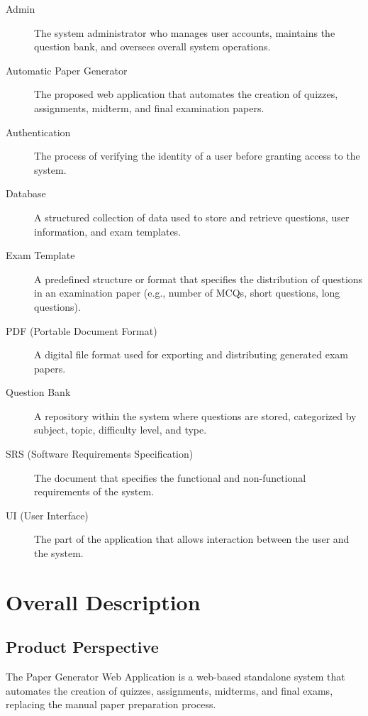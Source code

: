 \documentclass[12pt]{article}
\begin{document}
	\begin{description}
		\item[Admin] The system administrator who manages user accounts, maintains the question bank, and oversees overall system operations.
		
		\item[Automatic Paper Generator] The proposed web application that automates the creation of quizzes, assignments, midterm, and final examination papers.
		
		\item[Authentication] The process of verifying the identity of a user before granting access to the system.
		
		\item[Database] A structured collection of data used to store and retrieve questions, user information, and exam templates.
		
		\item[Exam Template] A predefined structure or format that specifies the distribution of questions in an examination paper (e.g., number of MCQs, short questions, long questions).
		
		\item[PDF (Portable Document Format)] A digital file format used for exporting and distributing generated exam papers.
		
		\item[Question Bank] A repository within the system where questions are stored, categorized by subject, topic, difficulty level, and type.
		
		\item[SRS (Software Requirements Specification)] The document that specifies the functional and non-functional requirements of the system.
		
		\item[UI (User Interface)] The part of the application that allows interaction between the user and the system.
	\end{description}
	
	
	\section{Overall Description}
	
	\subsection{Product Perspective}
	The Paper Generator Web Application is a web-based standalone system that automates the creation of quizzes, assignments, midterms, and final exams, replacing the manual paper preparation process.
	
\end{document}
